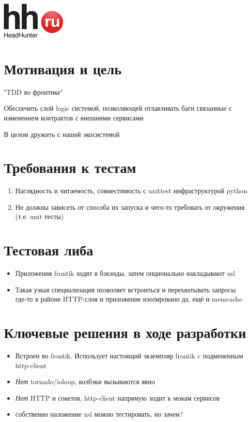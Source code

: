 \documentclass[12pt]{article}
\begin{document}
\includegraphics{logo.png}
\TitleSlide

\section{Мотивация и цель}
"TDD во фронтике"

Обеспечить слой logic системой, позволяющей отлавливать баги связанные с изменением контрактов с внешними сервисами

В целом дружить с нашей экосистемой

\section{Требования к тестам}

\begin{enumerate}
\item Наглядность и читаемость, совместимость с unittest инфраструктурой python
\item Не должны зависеть от способа их запуска и чего-то требовать от окружения (т.е. unit тесты)
\end{enumerate}

\section{Тестовая либа}

\begin{itemize}
\item Приложения frontik ходят в бэкэнды, затем опционально накладывают xsl
\item Такая узкая специализация позволяет встроиться и перехватывать запросы где-то в районе HTTP-слоя и приложение изолировано
да, ещё и memcache

\end{itemize}

\section{Ключевые решения в ходе разработки}

\begin{itemize}
\item Встроен во frontik. Использует настоящий экземпляр frontik c подмененным http-client
\item \emph{Нет} tornado/ioloop, колбэки вызываются явно
\item \emph{Нет} HTTP и сокетов, http-client напрямую ходит к мокам сервисов
\item собственно наложение xsl можно тестировать, но зачем?

\end{itemize}
\end{document}
